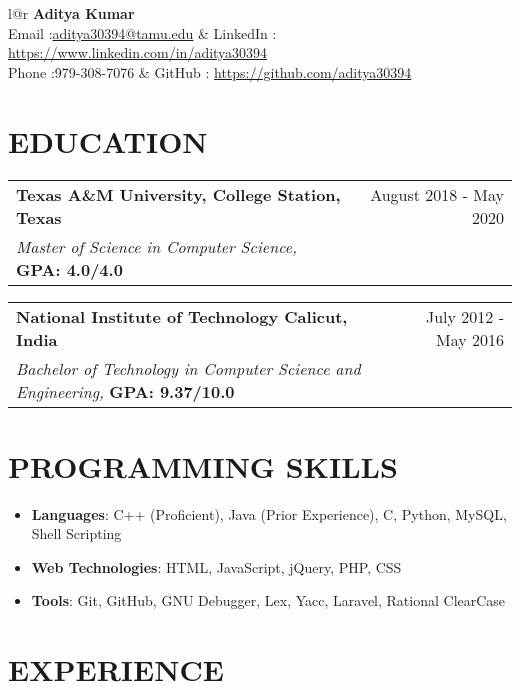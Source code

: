 \documentclass[12pt]{article}
\makeatletter
\newcommand{\resumeItem}[2]{
  \item{
    \textbf{#1}{: #2 \vspace{-2pt}}
  }
}
\newcommand{\resumeEduHeading}[5]{
    \vspace{-1pt}
    \begin{tabular*}{\textwidth}{l@{\extracolsep{\fill}}r}
      \textbf{#1} & #2 \\
      \textit{\small#3} \textbf{#4}& \textit{\small #5} \\
    \end{tabular*}
}
\newcommand{\resumeSubItem}[2]{\resumeItem{#1}{#2}\vspace{-4pt}}
\newcommand{\resumeSubHeadingListStart}{\begin{itemize}[leftmargin=*]}
\newcommand{\resumeSubHeadingListEnd}{\end{itemize}}
\makeatother
\begin{document}
\begin{tabular*}{\textwidth}{l@{\extracolsep{\fill}}r}
  \textbf{\Huge\hfill Aditya Kumar \hfill} \\
  Email :\hfill \href{mailto:aditya30394@tamu.edu}{aditya30394@tamu.edu} & LinkedIn : \href{https://www.linkedin.com/in/aditya30394}{https://www.linkedin.com/in/aditya30394} \\
  Phone :\hfill 979-308-7076 & GitHub : \href{https://github.com/aditya30394}{https://github.com/aditya30394} \\
\end{tabular*}


\section{EDUCATION}
    \resumeEduHeading
      {Texas A\&M University, College Station, Texas}{August 2018 - May 2020}
      {Master of Science in Computer Science, }{GPA: 4.0/4.0 }{}
    \resumeEduHeading
      {National Institute of Technology Calicut, India} {July 2012 - May 2016}
      {Bachelor of Technology in Computer Science and Engineering, }{GPA:  9.37/10.0}{}
\vspace{-10pt}

\section{PROGRAMMING SKILLS}
  \resumeSubHeadingListStart
    \resumeSubItem{Languages}
    {C++ (Proficient), Java (Prior Experience), C, Python, MySQL, Shell Scripting}
    \resumeSubItem{Web Technologies}
    {HTML, JavaScript, jQuery, PHP, CSS}
    \resumeSubItem{Tools}
    {Git, GitHub, GNU Debugger, Lex, Yacc, Laravel, Rational ClearCase}
  \resumeSubHeadingListEnd
\section{EXPERIENCE}
\end{document}
